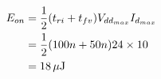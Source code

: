 \subsection{}

\begin{align*}
E_{on} & = \frac{1}{2} (t_{ri} + t_{fv}) V_{dd_{max} } I_{d_{max}} \\
        & = \frac{1}{2} (100n+50n) 24 \times 10 \\
        & = \unit[18]{\mu{}J}
\end{align*}